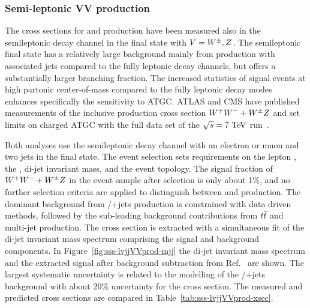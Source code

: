 \subsubsection{Semi-leptonic VV production}
\label{sss-VVprod}



The cross sections for \WW\; and \WZ\; production have been measured also in the 
semileptonic decay channel in the \WVlvqq\; final state with $V=W^{\pm},Z$.
The semileptonic final state has a relatively large background mainly from \V\; production
with associated jets compared to the fully leptonic decay channels, but offers a 
substantially larger branching fraction. The increased statistics of signal events 
at high partonic center-of-mass compared to the fully leptonic 
decay modes enhances specifically the sensitivity to ATGC.
ATLAS and CMS have published measurements of the
inclusive production cross section ${W^+W^-}+{W^{\pm}Z}$ and set limits on charged ATGC 
with the full data set of the $\rts=7\TeV$ run~\cite{Aad:2014mda,Chatrchyan:2012bd}.

Both analyses use the semileptonic decay channel with an electron or muon
and two jets in the final state.
The event selection sets requirements 
on the lepton \pT, the \MET, di-jet invariant mass, and the event topology. 
The signal fraction of $W^+W^-+W^{\pm}Z$ in the event sample after selection is only about 1\%, 
and no further selection criteria are applied to distinguish between 
\WW and \WZ production.
The dominant background from \Z/\W+jets production is constrained with data driven methods,
followed by the sub-leading background contributions from $t\bar{t}$ and multi-jet production. 
The cross section is extracted with a simultaneous fit of the di-jet invariant mass 
spectrum comprising the signal and background components. In Figure~\ref{fig:sss-lvjjVVprod-mjj} the di-jet invariant
mass spectrum and the extracted signal after background subtraction from Ref.~\cite{Aad:2014mda} are shown. 
The largest systematic uncertainty is related to the modelling of the \Z/\W+jets background
with about 20\% uncertainty for the cross section.
The measured and predicted cross sections are compared in Table~\ref{tab:sss-lvjjVVprod-xsec}. 



